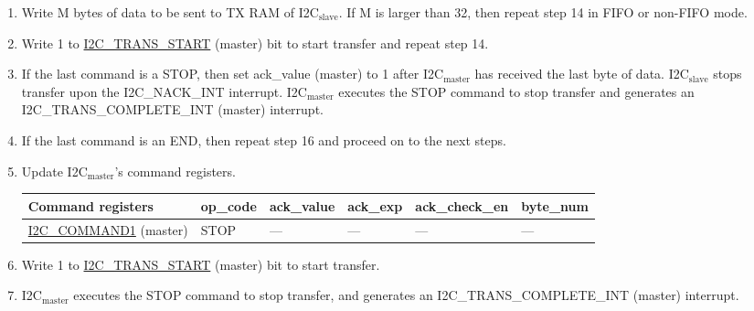\documentclass[main\_\_EN.tex]{subfiles}
\begin{document}
\begin{enumerate}
\item Write M bytes of data to be sent to TX RAM of I2C$_\text{slave}$. If M is larger than 32, then repeat step 14 in FIFO or non-FIFO mode.
\item Write 1 to \hyperref[fielddesc:I2CTRANSSTART]{I2C\_TRANS\_START} (master) bit to start transfer and repeat step 14.
\item If the last command is a STOP, then set ack\_value (master) to 1 after I2C$_\text{master}$ has received the last byte of data. I2C$_\text{slave}$ stops transfer upon the I2C\_NACK\_INT interrupt. I2C$_\text{master}$ executes the STOP command to stop transfer and generates an I2C\_TRANS\_COMPLETE\_INT (master) interrupt.
\item If the last command is an END, then repeat step 16 and proceed on to the next steps.
\item Update I2C$_\text{master}$'s command registers.
\begin{longtable}{ | p{4cm} | p{2cm} | p{2cm} | p{2cm} |p{2cm} | p{2cm} |}
\hline\rowcolor{lightgray}
Command registers & op\_code & ack\_value&ack\_exp&ack\_check\_en&byte\_num  \\ \hline
\hyperref[fielddesc:I2CCOMMAND1]{I2C\_COMMAND1} (master)& STOP& ---&---&---&---  \\ \hline
\end{longtable}
\item Write 1 to \hyperref[fielddesc:I2CTRANSSTART]{I2C\_TRANS\_START} (master) bit to start transfer.
\item I2C$_\text{master}$ executes the STOP command to stop transfer, and generates an I2C\_TRANS\_COMPLETE\_INT (master) interrupt.

\end{enumerate}
\end{document}
